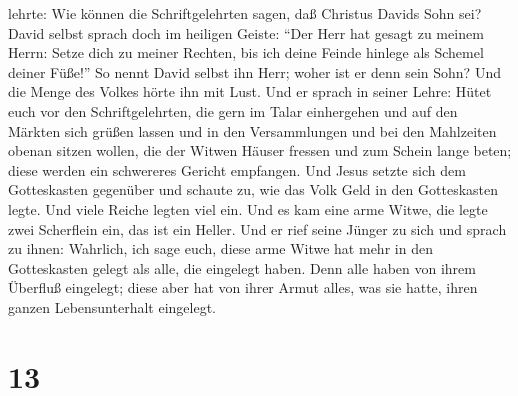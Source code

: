 lehrte: Wie können die Schriftgelehrten sagen, daß Christus Davids Sohn
sei?  David selbst sprach doch im heiligen Geiste: ``Der
Herr hat gesagt zu meinem Herrn: Setze dich zu meiner Rechten, bis ich
deine Feinde hinlege als Schemel deiner Füße!''  So nennt
David selbst ihn Herr; woher ist er denn sein Sohn? Und die Menge des
Volkes hörte ihn mit Lust.  Und er sprach in seiner
Lehre: Hütet euch vor den Schriftgelehrten, die gern im Talar
einhergehen und auf den Märkten sich grüßen lassen  und
in den Versammlungen und bei den Mahlzeiten obenan sitzen wollen,
 die der Witwen Häuser fressen und zum Schein lange
beten; diese werden ein schwereres Gericht empfangen. 
Und Jesus setzte sich dem Gotteskasten gegenüber und schaute zu, wie das
Volk Geld in den Gotteskasten legte. Und viele Reiche legten viel ein.
 Und es kam eine arme Witwe, die legte zwei Scherflein
ein, das ist ein Heller.  Und er rief seine Jünger zu
sich und sprach zu ihnen: Wahrlich, ich sage euch, diese arme Witwe hat
mehr in den Gotteskasten gelegt als alle, die eingelegt haben.
 Denn alle haben von ihrem Überfluß eingelegt; diese aber
hat von ihrer Armut alles, was sie hatte, ihren ganzen Lebensunterhalt
eingelegt.

\hypertarget{section-12}{%
\section{13}\label{section-12}}

